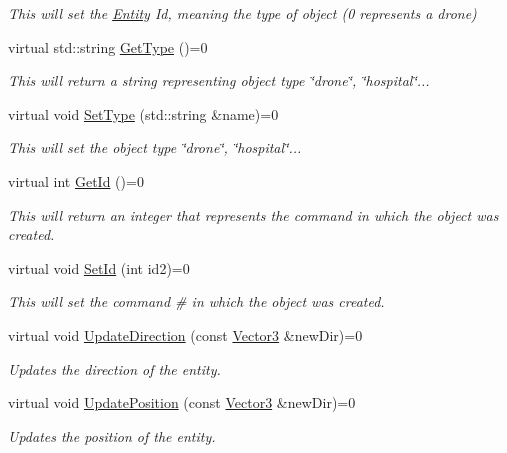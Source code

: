\begin{DoxyCompactItemize}
\begin{DoxyCompactList}\small\item\em This will set the \hyperlink{classEntity}{Entity} Id, meaning the type of object (0 represents a drone) \end{DoxyCompactList}\item 
virtual std\+::string \hyperlink{classIEntity_ac494bb9712d5a03495a1a95afdbd7153}{Get\+Type} ()=0
\begin{DoxyCompactList}\small\item\em This will return a string representing object type \char`\"{}drone\char`\"{}, \char`\"{}hospital\char`\"{}... \end{DoxyCompactList}\item 
virtual void \hyperlink{classIEntity_a49b3c54f94a93d4a9f96527ffb8982f5}{Set\+Type} (std\+::string \&name)=0
\begin{DoxyCompactList}\small\item\em This will set the object type \char`\"{}drone\char`\"{}, \char`\"{}hospital\char`\"{}... \end{DoxyCompactList}\item 
virtual int \hyperlink{classIEntity_ac3d60cc2fab1ccb61c1be92373e636d9}{Get\+Id} ()=0
\begin{DoxyCompactList}\small\item\em This will return an integer that represents the command in which the object was created. \end{DoxyCompactList}\item 
virtual void \hyperlink{classIEntity_a8c6af682e07f569ba2f164d214295c67}{Set\+Id} (int id2)=0
\begin{DoxyCompactList}\small\item\em This will set the command \# in which the object was created. \end{DoxyCompactList}\item 
virtual void \hyperlink{classIEntity_af24054e349dcdaea31a778427a34495d}{Update\+Direction} (const \hyperlink{classVector3}{Vector3} \&new\+Dir)=0
\begin{DoxyCompactList}\small\item\em Updates the direction of the entity. \end{DoxyCompactList}\item 
virtual void \hyperlink{classIEntity_ad30f6845c8747534e7607ca97addbdc6}{Update\+Position} (const \hyperlink{classVector3}{Vector3} \&new\+Dir)=0
\begin{DoxyCompactList}\small\item\em Updates the position of the entity. \end{DoxyCompactList}\item 

\end{DoxyCompactItemize}
